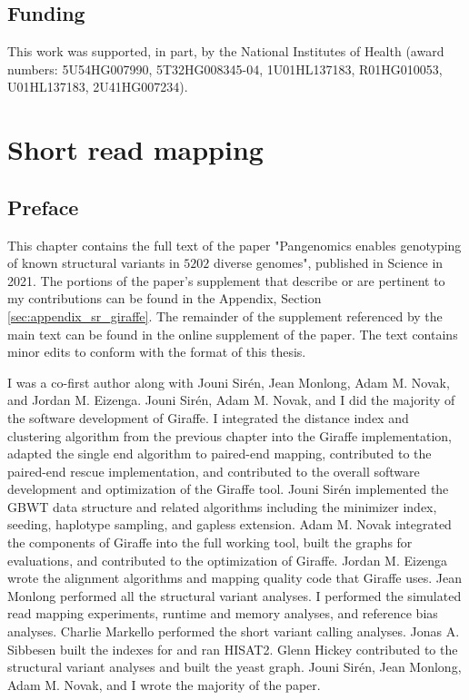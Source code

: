 \documentclass[11pt]{ucscthesis}
\begin{document}
\section{Funding}
This work was supported, in part, by the National Institutes of Health (award numbers: 5U54HG007990, 5T32HG008345-04, 1U01HL137183, R01HG010053, U01HL137183, 2U41HG007234).

\chapter{Short read mapping}
\label{chapter:sr-giraffe}
\section{Preface}
This chapter contains the full text of the paper "Pangenomics enables genotyping of known structural variants in $5202$ diverse genomes"\cite{sr_giraffe_2021}, published in Science in 2021.
The portions of the paper's supplement that describe or are pertinent to my contributions can be found in the Appendix, Section \ref{sec:appendix_sr_giraffe}.
The remainder of the supplement referenced by the main text can be found in the online supplement of the paper.
The text contains minor edits to conform with the format of this thesis.

I was a co-first author along with Jouni Sirén, Jean Monlong, Adam M. Novak, and Jordan M. Eizenga.
Jouni Sirén, Adam M. Novak, and I did the majority of the software development of Giraffe.
I integrated the distance index and clustering algorithm from the previous chapter into the Giraffe implementation, adapted the single end algorithm to paired-end mapping, contributed to the paired-end rescue implementation, and contributed to the overall software development and optimization of the Giraffe tool.
Jouni Sirén implemented the GBWT data structure and related algorithms including the minimizer index, seeding, haplotype sampling, and gapless extension.
Adam M. Novak integrated the components of Giraffe into the full working tool, built the graphs for evaluations, and contributed to the optimization of Giraffe.
Jordan M. Eizenga wrote the alignment algorithms and mapping quality code that Giraffe uses.
Jean Monlong performed all the structural variant analyses.
I performed the simulated read mapping experiments, runtime and memory analyses, and reference bias analyses. 
Charlie Markello performed the short variant calling analyses.
Jonas A. Sibbesen built the indexes for and ran HISAT2.
Glenn Hickey contributed to the structural variant analyses and built the yeast graph.
Jouni Sirén, Jean Monlong, Adam M. Novak, and I wrote the majority of the paper. 
\end{document}
